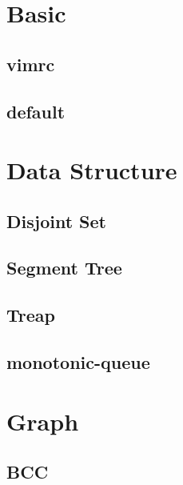 \documentclass[a4paper,10pt,twocolumn,oneside]{article}
\begin{document}
\pagestyle{fancy}
\fancyfoot{}
\fancyhead[R]{\thepage}
\renewcommand{\headrulewidth}{0.4pt}
\renewcommand{\contentsname}{Contents} 

\scriptsize
\tableofcontents

\newpage

\section{Basic}
\subsection{vimrc}

\subsection{default}


\newpage
\section{Data Structure}
\subsection{Disjoint Set}

\subsection{Segment Tree}

\subsection{Treap}

\subsection{monotonic-queue}

\newpage

\section{Graph}
\subsection{BCC}

\end{document}
